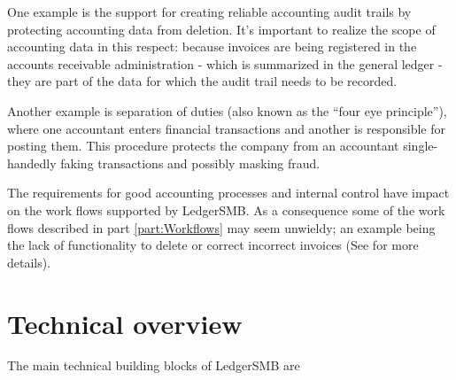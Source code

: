 One example is the support for creating reliable accounting audit trails
by protecting accounting data from deletion. It's important to realize the scope
of accounting data in this respect: because invoices are being registered in the
accounts receivable administration - which is summarized in the general ledger -
they are part of the data for which the audit trail needs to be recorded.

Another example is separation of duties (also known as the ``four eye principle''),
where one accountant enters financial transactions and another is responsible for
posting them. This procedure protects the company from an accountant single-handedly
faking transactions and possibly masking fraud.

The requirements for good accounting processes and internal control have impact
on the work flows supported by LedgerSMB. As a consequence some of the work flows
described in part \ref{part:Workflows} may seem unwieldy; an example being the
lack of functionality to delete or correct incorrect invoices (See  for more details).



\section{Technical overview}




The main technical building blocks of LedgerSMB are

